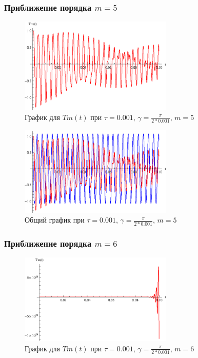 \newpage

\subsubsection{Приближение порядка $m=5$}

\begin{figure}[h]
\begin{center}
\includegraphics[width=0.65\textwidth]{./3_results/5_10.eps}
\end{center}
\caption{График для $Tm(t)$ при $\tau=0.001$, $\gamma = \frac{\pi}{2*0.001}$, $m=5$}
\end{figure}

\begin{figure}[h]
\begin{center}
\includegraphics[width=0.65\textwidth]{./3_results/5_11.eps}
\end{center}
\caption{Общий график при $\tau=0.001$, $\gamma = \frac{\pi}{2*0.001}$, $m=5$}
\end{figure}

\newpage

\subsubsection{Приближение порядка $m=6$}

\begin{figure}[h]
\begin{center}
\includegraphics[width=0.65\textwidth]{./3_results/5_12.eps}
\end{center}
\caption{График для $Tm(t)$ при $\tau=0.001$, $\gamma = \frac{\pi}{2*0.001}$, $m=6$}
\end{figure}

